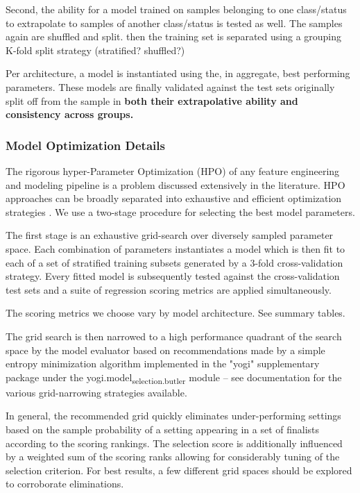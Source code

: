 \documentclass[11pt]{article}
\begin{document}
Second, the ability for a model trained on samples belonging to one
class/status to extrapolate to samples of another class/status is
tested as well. The samples again are shuffled and split. then the
training set is separated using a grouping K-fold split strategy (stratified? shuffled?)

Per architecture, a model is instantiated using the, in aggregate,
best performing parameters. These models are finally validated against
the test sets originally split off from the sample in \textbf{both their
extrapolative ability and consistency across groups.}

\subsubsection{Model Optimization Details}
\label{sec:orgb365103}
The rigorous hyper-Parameter Optimization (HPO) of any feature
engineering and modeling pipeline is a problem discussed extensively
in the literature. HPO approaches can be broadly separated into
exhaustive and efficient optimization strategies
\cite{yang-2020-hyper-optim}. We use a two-stage procedure for
selecting the best model parameters.

The first stage is an exhaustive grid-search over diversely sampled
parameter space. Each combination of parameters instantiates a model
which is then fit to each of a set of stratified training subsets
generated by a 3-fold cross-validation strategy. Every fitted model is
subsequently tested against the cross-validation test sets and a suite
of regression scoring metrics are applied simultaneously.

The scoring metrics we choose vary by model architecture. See summary tables.

The grid search is then narrowed to a high performance quadrant of the
search space by the model evaluator based on recommendations made by a
simple entropy minimization algorithm implemented in the "yogi"
supplementary package under the yogi.model\textsubscript{selection.butler} module --
see documentation for the various grid-narrowing strategies available.

In general, the recommended grid quickly eliminates under-performing
settings based on the sample probability of a setting appearing in a
set of finalists according to the scoring rankings. The selection
score is additionally influenced by a weighted sum of the scoring
ranks allowing for considerably tuning of the selection criterion.
For best results, a few different grid spaces should be explored to
corroborate eliminations.
\end{document}
